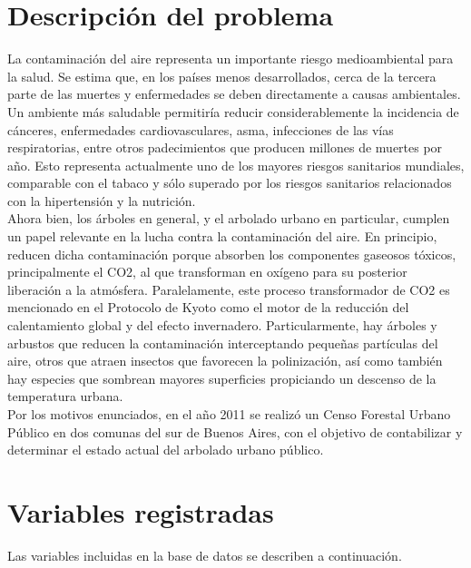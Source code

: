 \documentclass{../prob}
\begin{document}
\section*{Descripción del problema}
La contaminación del aire representa un importante riesgo medioambiental para la salud. Se estima que, en los países menos desarrollados, cerca de la tercera parte de las muertes y enfermedades se deben directamente a causas ambientales. Un ambiente más saludable permitiría reducir considerablemente la incidencia de cánceres, enfermedades cardiovasculares, asma, infecciones de las vías respiratorias, entre otros padecimientos que producen millones de muertes por año. Esto representa actualmente uno de los mayores riesgos sanitarios mundiales, comparable con el tabaco y sólo superado por los riesgos sanitarios relacionados con la hipertensión y la nutrición. \\
Ahora bien, los árboles en general, y el arbolado urbano en particular, cumplen un papel relevante en la lucha contra la contaminación del aire. En principio, reducen dicha contaminación porque absorben los componentes gaseosos tóxicos, principalmente el CO2, al que transforman en oxígeno para su posterior liberación a la atmósfera. Paralelamente, este proceso transformador de CO2 es mencionado en el Protocolo de Kyoto como el motor de la reducción del calentamiento global y del efecto invernadero.
Particularmente, hay árboles y arbustos que reducen la contaminación interceptando pequeñas partículas del aire, otros que atraen insectos que favorecen la polinización, así como también hay especies que sombrean mayores superficies propiciando un descenso de la temperatura urbana. \\
Por los motivos enunciados, en el año 2011 se realizó un Censo Forestal Urbano Público en dos comunas del sur de Buenos Aires, con el objetivo de contabilizar y determinar el estado actual del arbolado urbano público.\\

\section*{Variables registradas}
Las variables incluidas en la base de datos se describen a continuación.
\end{document}

